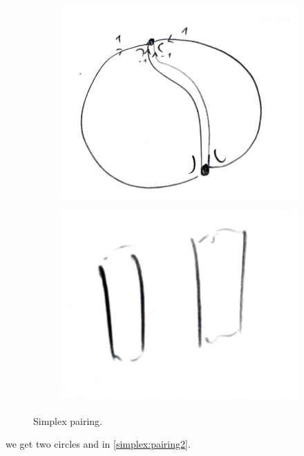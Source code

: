 \documentclass[10pt,a4paper,twoside,openany,hidelinks]{book}
\begin{document}
\begin{figure}[!tbp]
  \begin{subfigure}[b]{0.4\textwidth}
    \includegraphics[width=\textwidth]{sources/4_1a}
  \end{subfigure}
  \hfill
  \begin{subfigure}[b]{0.4\textwidth}
    \includegraphics[width=\textwidth]{sources/4_1b}
  \end{subfigure}
  \caption{Simplex pairing.}
  \label{simplex:pairing}
\end{figure}
we get two circles and in \eqref{simplex:pairing2}.
\end{document}
